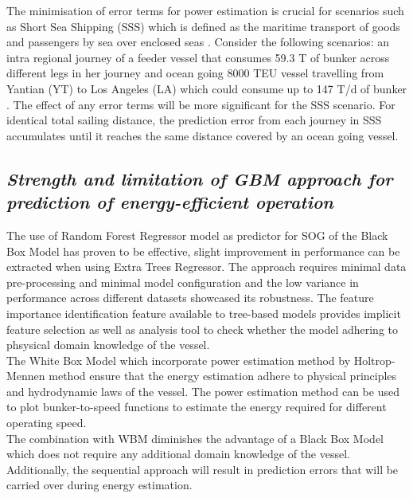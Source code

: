 The minimisation of error terms for power estimation is crucial for scenarios such as Short Sea Shipping (SSS) which is defined as the maritime transport of goods and passengers by sea over enclosed seas . Consider the following scenarios: an intra regional journey of a feeder vessel that consumes 59.3 T of bunker across different legs in her journey  and ocean going 8000 TEU vessel travelling from Yantian (YT) to Los Angeles (LA) which could consume up to 147 T/d of bunker . The effect of any error terms will be more significant for the SSS scenario. For identical total sailing distance, the prediction error from each journey in SSS accumulates until it reaches the same distance covered by an ocean going vessel.\\

\subsection*{\emph{Strength and limitation of GBM approach for prediction of energy-efficient operation}}

The use of Random Forest Regressor model as predictor for SOG of the Black Box Model has proven to be effective, slight improvement in performance can be extracted when using Extra Trees Regressor. The approach requires minimal data pre-processing and minimal model configuration and the low variance in performance across different datasets showcased its robustness. The feature importance identification feature available to tree-based models provides implicit feature selection as well as analysis tool to check whether the model adhering to phsysical domain knowledge of the vessel.\\

The White Box Model which incorporate power estimation method by Holtrop-Mennen method ensure that the energy estimation adhere to physical principles and hydrodynamic laws of the vessel. The power estimation method can be used to plot bunker-to-speed functions to estimate the energy required for different operating speed.\\

The combination with WBM diminishes the advantage of a Black Box Model which does not require any additional domain knowledge of the vessel. Additionally, the sequential approach will result in prediction errors that will be carried over during energy estimation.\\ 

